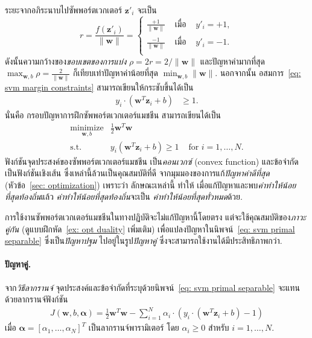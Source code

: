 ระยะจากอภิระนาบไปซัพพอร์ตเวกเตอร์ $\bm{z}'_i$ จะเป็น
\[
r = \frac{f(\bm{z}'_i)}{\|\bm{w}\|}
= \left\{
\begin{array}{lll}
\frac{+1}{\|\bm{w}\|} & \mbox{ เมื่อ } & y'_i = +1, \\
\frac{-1}{\|\bm{w}\|} & \mbox{ เมื่อ } & y'_i = -1. \\
\end{array}
\right.
\]
ดังนั้นความกว้างของ\textit{ขอบเขตของการแบ่ง} $\rho = 2 r = 2/\|\bm{w}\|$
และปัญหาค่ามากที่สุด
$\max_{\bm{w}, b} \rho = \frac{2}{\|\bm{w}\|}$
ก็เทียบเท่าปัญหาค่าน้อยที่สุด
$\min_{\bm{w}, b} \|\bm{w}\|$.
%
นอกจากนั้น
อสมการ~\ref{eq: svm margin constraints} สามารถเขียนให้กระชับขึ้นได้เป็น
\begin{eqnarray}
y_i \cdot (\bm{w}^T \bm{z}_i + b) & \geq 1 
\label{eq: svm concise margin constraints}.
\end{eqnarray}
นั่นคือ กรอบปัญหาการฝึกซัพพอร์ตเวกเตอร์แมชชีน สามารถเขียนได้เป็น
\begin{eqnarray}
\underset{\bm{w}, b}{\mathrm{minimize}} &  \frac{1}{2} \bm{w}^T \bm{w} &
\nonumber \\
\mbox{s.t.} 
& y_i (\bm{w}^T \bm{z}_i + b) \geq 1 & \mbox{ for } i =1, \ldots, N.
\label{eq: svm primal separable}
\end{eqnarray}
ฟังก์ชันจุดประสงค์ของซัพพอร์ตเวกเตอร์แมชชีน เป็น\textit{คอนเวกซ์} (convex function)
และข้อจำกัดเป็นฟังก์ชันเชิงเส้น 
ซึ่งเหล่านี้ล้วนเป็นคุณสมบัติที่ดี
จากมุมมองของการแก้\textit{ปัญหาค่าดีที่สุด} (หัวข้อ~\ref{sec: optimization}) เพราะว่า
ลักษณะเหล่านี้
ทำให้ 
เมื่อแก้ปัญหาและพบ\textit{ค่าทำให้น้อยที่สุดท้องถิ่น}แล้ว 
\textit{ค่าทำให้น้อยที่สุดท้องถิ่น}จะเป็น
\textit{ค่าทำให้น้อยที่สุดทั่วหมด}ด้วย.

การใช้งานซัพพอร์ตเวกเตอร์แมชชีนในทางปฏิบัติจะไม่แก้ปัญหานี้โดยตรง
แต่จะใช้คุณสมบัติของ\textit{ภาวะคู่กัน} (ดูแบบฝึกหัด~\ref{ex: opt duality} เพิ่มเติม) เพื่อแปลงปัญหาในนิพจน์~\ref{eq: svm primal separable} ซึ่งเป็น\textit{ปัญหาปฐม}
ไปอยู่ในรูป\textit{ปัญหาคู่} ซึ่งจะสามารถใช้งานได้มีประสิทธิภาพกว่า.

\paragraph{ปัญหาคู่.}
จาก\textit{วิธีลากรานจ์}\cite{ChongZak2ndEd}
จุดประสงค์และข้อจำกัดที่ระบุด้วยนิพจน์~\ref{eq: svm primal separable}
จะแทนด้วยลากรานจ์ฟังก์ชัน
\begin{eqnarray}
J(\bm{w}, b, \bm{\alpha}) = \frac{1}{2} \bm{w}^T \bm{w} 
- \sum_{i=1}^N \alpha_i \cdot \left( y_i \cdot (\bm{w}^T \bm{z}_i + b)- 1\right)
\label{eq: svm primal lagrange objective}
\end{eqnarray}
เมื่อ $\bm{\alpha} = [\alpha_1, \ldots, \alpha_N]^T$
เป็นลากรานจ์พารามิเตอร์ โดย $\alpha_i \geq 0$ สำหรับ $i=1, \ldots, N$.

